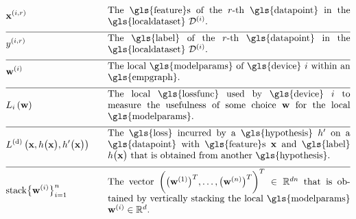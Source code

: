 \begin{align} 
		&\featurevec^{(\nodeidx,\sampleidx)} & \quad & \parbox{.75\textwidth}{The \gls{feature}s of the $\sampleidx$-th \gls{datapoint} in 
		the \gls{localdataset} $\localdataset{\nodeidx}$.} \nonumber \\[2mm] \hline \nonumber\\[-5mm]
	&\truelabel^{(\nodeidx,\sampleidx)} & \quad & \parbox{.75\textwidth}{The \gls{label} of the $\sampleidx$-th \gls{datapoint} in 
		the \gls{localdataset} $\localdataset{\nodeidx}$.} \nonumber \\[2mm] \hline \nonumber\\[-5mm]
		&\localparams{\nodeidx} & \quad & \parbox{.75\textwidth}{The local \gls{modelparams} of \gls{device} $\nodeidx$ within an \gls{empgraph}.} \nonumber \\[2mm] \hline \nonumber\\[-5mm]
		&\locallossfunc{\nodeidx}{\weights} & \quad & \parbox{.75\textwidth}{The local \gls{lossfunc} used by \gls{device} $\nodeidx$ 
		to measure the usefulness of some choice $\weights$ for the local \gls{modelparams}.}\nonumber \\[2mm] \hline \nonumber\\[-5mm]
	& \gtvloss{\featurevec}{\hypothesis\big(\featurevec\big)}{\hypothesis'\big(\featurevec\big)}& \quad & \parbox{.75\textwidth}{The \gls{loss} 
		incurred by a \gls{hypothesis} $\hypothesis'$ on a \gls{datapoint} with \gls{feature}s $\featurevec$ and \gls{label} 
		$\hypothesis\big( \featurevec\big)$ that is obtained from another \gls{hypothesis}.}\nonumber \\[2mm] \hline \nonumber\\[-5mm]
		& 	{\rm stack} \big\{ \weights^{(\nodeidx)} \big\}_{\nodeidx=1}^{\nrnodes} & \quad & \parbox{.75\textwidth}{The vector $\bigg( \big(\weights^{(1)}  \big)^{T}, \ldots, \big(\weights^{(\nrnodes)}  \big)^{T} \bigg)^{T} \in \mathbb{R}^{\dimlocalmodel\nrnodes}$ that 
			is obtained by vertically stacking the local \gls{modelparams} $\weights^{(\nodeidx)} \in \mathbb{R}^{\dimlocalmodel}$.} \nonumber  
\end{align}        


